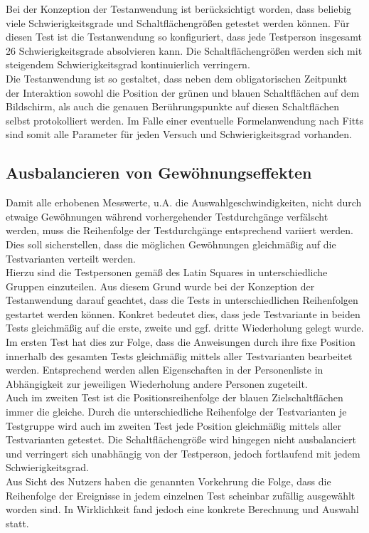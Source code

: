 \documentclass[12pt,numbers=noenddot,parskip,bibliography=totocnumbered,listof=totocnumbered]{scrreprt}
\begin{document}
Bei der Konzeption der Testanwendung ist berücksichtigt worden, dass beliebig viele Schwierigkeitsgrade und Schaltflächengrößen getestet werden können. Für diesen Test ist die Testanwendung so konfiguriert, dass jede Testperson insgesamt 26 Schwierigkeitsgrade absolvieren kann. Die Schaltflächengrößen werden sich mit steigendem Schwierigkeitsgrad kontinuierlich verringern.\\
Die Testanwendung ist so gestaltet, dass neben dem obligatorischen Zeitpunkt der Interaktion sowohl die Position der grünen und blauen Schaltflächen auf dem Bildschirm, als auch die genauen Berührungspunkte auf diesen Schaltflächen selbst protokolliert werden. Im Falle einer eventuelle Formelanwendung nach Fitts \citep{fitts} sind somit alle Parameter für jeden Versuch und Schwierigkeitsgrad vorhanden.

\subsection{Ausbalancieren von Gewöhnungseffekten}
Damit alle erhobenen Messwerte, u.A. die Auswahlgeschwindigkeiten, nicht durch etwaige Gewöhnungen während vorhergehender Testdurchgänge verfälscht werden, muss die Reihenfolge der Testdurchgänge entsprechend variiert werden. Dies soll sicherstellen, dass die möglichen Gewöhnungen gleichmäßig auf die Testvarianten verteilt werden.\\
Hierzu sind die Testpersonen gemäß des Latin Squares in unterschiedliche Gruppen einzuteilen. Aus diesem Grund wurde bei der Konzeption der Testanwendung darauf geachtet, dass die Tests in unterschiedlichen Reihenfolgen gestartet werden können. Konkret bedeutet dies, dass jede Testvariante in beiden Tests gleichmäßig auf die erste, zweite und ggf. dritte Wiederholung gelegt wurde.\\
Im ersten Test hat dies zur Folge, dass die Anweisungen durch ihre fixe Position innerhalb des gesamten Tests gleichmäßig mittels aller Testvarianten bearbeitet werden. Entsprechend werden allen Eigenschaften in der Personenliste in Abhängigkeit zur jeweiligen Wiederholung andere Personen zugeteilt.\\
Auch im zweiten Test ist die Positionsreihenfolge der blauen Zielschaltflächen immer die gleiche. Durch die unterschiedliche Reihenfolge der Testvarianten je Testgruppe wird auch im zweiten Test jede Position gleichmäßig mittels aller Testvarianten getestet. Die Schaltflächengröße wird hingegen nicht ausbalanciert und verringert sich unabhängig von der Testperson, jedoch fortlaufend mit jedem Schwierigkeitsgrad.\\
Aus Sicht des Nutzers haben die genannten Vorkehrung die Folge, dass die Reihenfolge der Ereignisse in jedem einzelnen Test scheinbar zufällig ausgewählt worden sind. In Wirklichkeit fand jedoch eine konkrete Berechnung und Auswahl statt.
\end{document}
